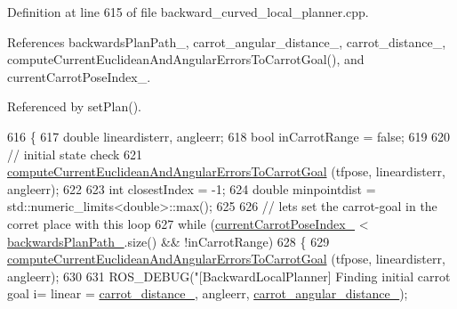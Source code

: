 Definition at line 615 of file backward\+\_\+curved\+\_\+local\+\_\+planner.\+cpp.



References backwards\+Plan\+Path\+\_\+, carrot\+\_\+angular\+\_\+distance\+\_\+, carrot\+\_\+distance\+\_\+, compute\+Current\+Euclidean\+And\+Angular\+Errors\+To\+Carrot\+Goal(), and current\+Carrot\+Pose\+Index\+\_\+.



Referenced by set\+Plan().


\begin{DoxyCode}
616         \{
617             \textcolor{keywordtype}{double} lineardisterr, angleerr;
618             \textcolor{keywordtype}{bool} inCarrotRange = \textcolor{keyword}{false};
619 
620             \textcolor{comment}{// initial state check}
621             \hyperlink{classcl__move__base__z_1_1backward__local__planner_1_1BackwardLocalPlanner_ad39ba029c760fc63ea286c74b5b9b795}{computeCurrentEuclideanAndAngularErrorsToCarrotGoal}
      (tfpose, lineardisterr, angleerr);
622 
623             \textcolor{keywordtype}{int} closestIndex = -1;
624             \textcolor{keywordtype}{double} minpointdist = std::numeric\_limits<double>::max();
625 
626             \textcolor{comment}{// lets set the carrot-goal in the corret place with this loop}
627             \textcolor{keywordflow}{while} (\hyperlink{classcl__move__base__z_1_1backward__local__planner_1_1BackwardLocalPlanner_a2e8f2b78bc97f27c5fa431f3af2261ed}{currentCarrotPoseIndex\_} < 
      \hyperlink{classcl__move__base__z_1_1backward__local__planner_1_1BackwardLocalPlanner_ad9cde5c85f782cab2ddb4030e3c3f2cf}{backwardsPlanPath\_}.size() && !inCarrotRange)
628             \{
629                 \hyperlink{classcl__move__base__z_1_1backward__local__planner_1_1BackwardLocalPlanner_ad39ba029c760fc63ea286c74b5b9b795}{computeCurrentEuclideanAndAngularErrorsToCarrotGoal}
      (tfpose, lineardisterr, angleerr);
630 
631                 ROS\_DEBUG(\textcolor{stringliteral}{"[BackwardLocalPlanner] Finding initial carrot goal i=%
       linear = %
      \hyperlink{classcl__move__base__z_1_1backward__local__planner_1_1BackwardLocalPlanner_a0bbb80ce5bae865c4322869422803296}{carrot\_distance\_}, angleerr, \hyperlink{classcl__move__base__z_1_1backward__local__planner_1_1BackwardLocalPlanner_a63e30befa09c4a67cf55086923b760c7}{carrot\_angular\_distance\_});
}
\end{DoxyCode}
